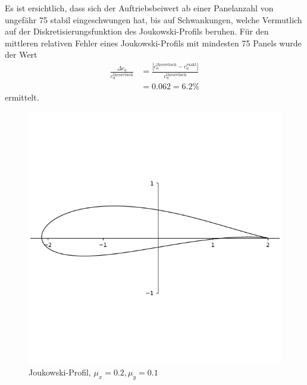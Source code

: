 Es ist ersichtlich, dass sich der Auftriebsbeiwert ab einer Panelanzahl von ungefähr 75 stabil eingeschwungen hat, bis auf Schwankungen, welche Vermutlich auf der Diskretisierungsfunktion des Joukowski-Profils beruhen. Für den mittleren relativen Fehler eines Joukowski-Profils mit mindesten 75 Panels wurde der Wert
\begin{align*}
\frac{\Delta c_a}{c_a^\mathrm{theoretisch}} &= \frac{|c_a^\mathrm{theoretisch} - c_a^\mathrm{exakt}|}{c_a^\mathrm{theoretisch}} \\
& = 0.062 = 6.2 \%
\end{align*}
ermittelt. \cite{Abello2018} \cite{Barba:2019}
\begin{figure}[!ht]
\begin{center} \includegraphics[scale=0.3]{figures/jouk0201.png} \end{center}
\caption{Joukowski-Profil, $\mu_x = 0.2, \mu_y =0.1$}
\label{fig:jouk0201}
\end{figure}